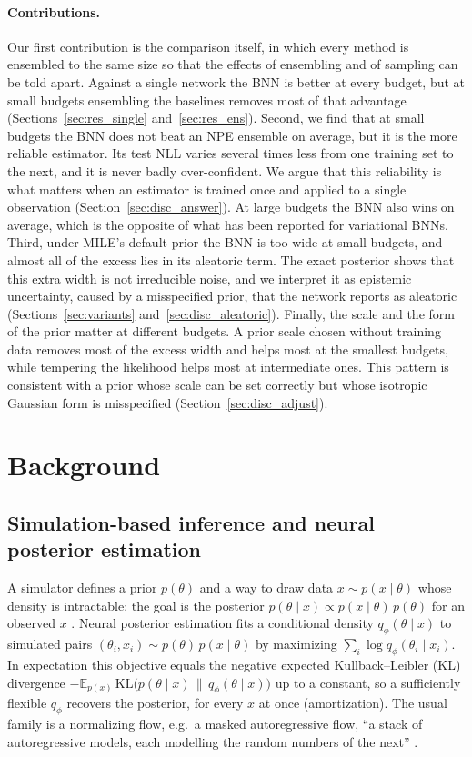 \documentclass[11pt]{article}
\begin{document}
\paragraph{Contributions.} Our first contribution is the comparison itself, in which every method is ensembled to the
same size so that the effects of ensembling and of sampling can be told apart. Against a single network the BNN is
better at every budget, but at small budgets ensembling the baselines removes most of that advantage
(Sections~\ref{sec:res_single} and~\ref{sec:res_ens}). Second, we find that at small budgets the BNN does not beat an
NPE ensemble on average, but it is the more reliable estimator. Its test NLL varies several times less from one
training set to the next, and it is never badly over-confident. We argue that this reliability is what matters when an
estimator is trained once and applied to a single observation (Section~\ref{sec:disc_answer}). At large budgets the
BNN also wins on average, which is the opposite of what has been reported for variational BNNs. Third, under MILE's
default prior the BNN is too wide at small budgets, and almost all of the excess lies in its aleatoric term. The exact
posterior shows that this extra width is not irreducible noise, and we interpret it as epistemic uncertainty, caused by
a misspecified prior, that the network reports as aleatoric (Sections~\ref{sec:variants}
and~\ref{sec:disc_aleatoric}). Finally, the scale and the form of the prior matter at different budgets. A prior scale
chosen without training data removes most of the excess width and helps most at the smallest budgets, while tempering
the likelihood helps most at intermediate ones. This pattern is consistent with a prior whose scale can be set
correctly but whose isotropic Gaussian form is misspecified (Section~\ref{sec:disc_adjust}).

\section{Background}
\label{sec:background}

\subsection{Simulation-based inference and neural posterior estimation}
\label{sec:bg_sbi}
A simulator defines a prior $p(\theta)$ and a way to draw data $x\sim p(x\mid\theta)$ whose density is
intractable; the goal is the posterior $p(\theta\mid x)\propto p(x\mid\theta)\,p(\theta)$ for an observed $x$
\citep{cranmer2020frontier}. Neural posterior estimation \citep{papamakarios2016fast} fits a conditional density
$q_\phi(\theta\mid x)$ to simulated pairs $(\theta_i,x_i)\sim p(\theta)\,p(x\mid\theta)$ by maximizing
$\sum_i\log q_\phi(\theta_i\mid x_i)$. In expectation this objective equals the negative
expected Kullback--Leibler (KL) divergence $-\mathbb{E}_{p(x)}\,\mathrm{KL}\big(p(\theta\mid x)\,\|\,q_\phi(\theta\mid x)\big)$ up to a constant, so a
sufficiently flexible $q_\phi$ recovers the posterior, for every $x$ at once (amortization). The usual family is a
normalizing flow, e.g.\ a masked autoregressive flow, ``a stack of autoregressive models, each modelling the
random numbers of the next'' \citep{papamakarios2017maf}.
\end{document}
